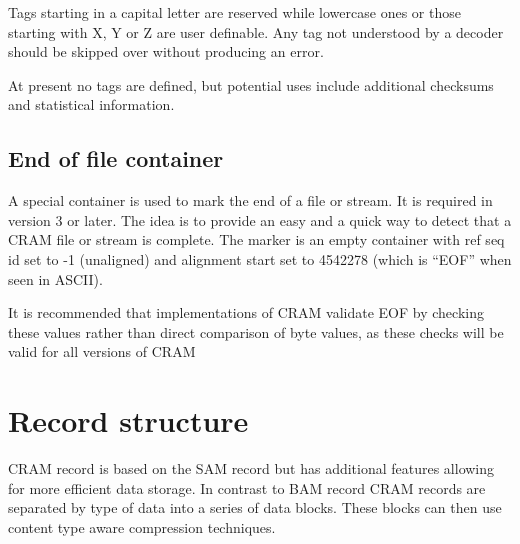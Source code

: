 \documentclass[a4paper]{article}
\begin{document}
Tags starting in a capital letter are reserved while lowercase ones or
those starting with X, Y or Z are user definable.  Any tag not
understood by a decoder should be skipped over without producing an
error.

At present no tags are defined, but potential uses include additional
checksums and statistical information.

%
% 


\subsection{End of file container}

A special container is used to mark the end of a file or stream. It is required in version 3 or later.
The idea is to provide an easy and a quick way to detect that a CRAM file or stream is complete.
The marker is an empty container with ref seq id set to -1 (unaligned) and alignment start set to 4542278 (which is ``EOF'' when seen in ASCII).

It is recommended that implementations of CRAM validate EOF by checking these values rather than direct comparison of byte values, as these checks will be valid for all versions of CRAM

\section{Record structure}
\label{sec:record}

CRAM record is based on the SAM record but has additional features allowing for 
more efficient data storage.  In contrast to BAM record CRAM records
are separated by type of data into a series of data blocks.  These
blocks can then use content type aware compression techniques.
\end{document}
